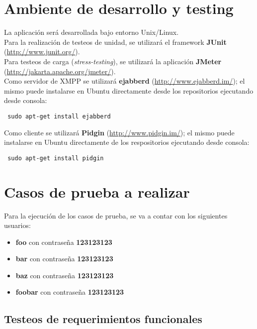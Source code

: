 \documentclass[a4paper,10pt]{article}
\begin{document}
\section{Ambiente de desarrollo y testing}
La aplicación será desarrollada bajo entorno Unix/Linux.\\

Para la realización de testeos de unidad, se utilizará el framework \textbf{JUnit} (\url{http://www.junit.org/}).\\

Para testeos de carga (\textit{stress-testing}), se utilizará la aplicación \textbf{JMeter} (\url{http://jakarta.apache.org/jmeter/}).\\

Como servidor de XMPP se utilizará \textbf{ejabberd} (\url{http://www.ejabberd.im/}); el mismo puede instalarse en Ubuntu directamente desde los repositorios 
ejecutando desde consola:
\begin{verbatim}
 sudo apt-get install ejabberd
\end{verbatim}
\par Como cliente se utilizará \textbf{Pidgin} (\url{http://www.pidgin.im/}); el mismo puede instalarse en Ubuntu directamente de los respositorios ejecutando 
desde consola:
\begin{verbatim}
 sudo apt-get install pidgin
\end{verbatim}

\section{Casos de prueba a realizar}
Para la ejecución de los casos de prueba, se va a contar con los siguientes usuarios:
\begin{itemize}
 \item \textbf{foo} con contraseña \textbf{123123123}
 \item \textbf{bar} con contraseña \textbf{123123123}
 \item \textbf{baz} con contraseña \textbf{123123123}
 \item \textbf{foobar} con contraseña \textbf{123123123}
\end{itemize}

\subsection{Testeos de requerimientos funcionales}
\end{document}

